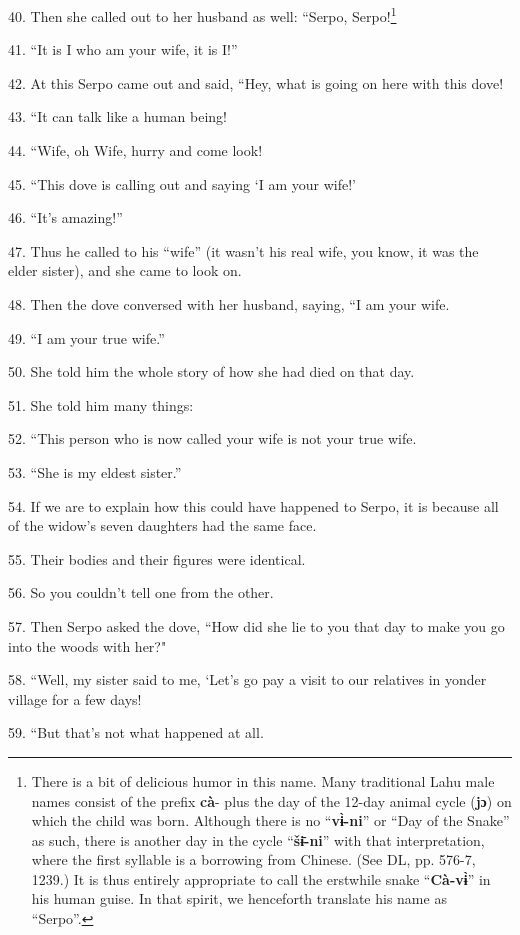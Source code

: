 40. Then she called out to her husband as well: ``Serpo, Serpo!\footnote{There is a bit of delicious humor in this name. Many traditional Lahu male names consist of the prefix \textbf{cà}- plus the day of the 12-day animal cycle (\textbf{jɔ}) on which the child was born. Although there is no ``\textbf{vɨ̀-ni}'' or ``Day of the Snake'' as such, there is another day in the cycle ``\textbf{šɨ̄-ni}'' with that interpretation, where the first syllable is a borrowing from Chinese. (See DL, pp. 576-7, 1239.) It is thus entirely appropriate to call the erstwhile snake ``\textbf{Cà-vɨ̀}'' in his human guise. In that spirit, we henceforth translate his name as ``Serpo''.}

41. ``It is I who am your wife, it is I!''

42. At this Serpo came out and said, ``Hey, what is going on here with
this dove!

43. ``It can talk like a human being!

44. ``Wife, oh Wife, hurry and come look!

45. ``This dove is calling out and saying `I am your wife!'

46. ``It's amazing!''

47. Thus he called to his ``wife'' (it wasn't his real wife, you
know, it was the elder sister), and she came to look on.

48. Then the dove conversed with her husband, saying, ``I am your wife.

49. ``I am your true wife.''

50. She told him the whole story of how she had died on that day.

51. She told him many things:

52. ``This person who is now called your wife is not your true wife.

53. ``She is my eldest sister.''

54. If we are to explain how this could have happened to Serpo, it is because all
of the widow's seven daughters had the same face.

55. Their bodies and their figures were identical.

56. So you couldn't tell one from the other.

57. Then Serpo asked the dove, ``How did she lie to you that day to make
you go into the woods with her?"

58. ``Well, my sister said to me, `Let's go pay a visit to our relatives
in yonder village for a few days!

59. ``But that's not what happened at all.

